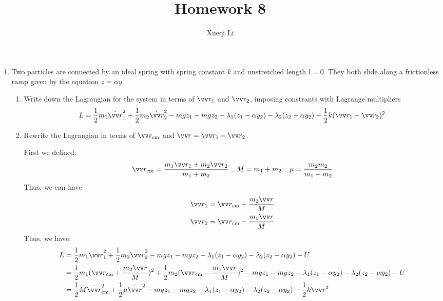 \documentclass{article}
\begin{document}
\title{Homework 8}
\author{Xueqi Li}


\maketitle
\begin{enumerate}
    \item Two particles are connected by an ideal spring with spring constant $k$ and unstretched length $l = 0$. They both slide along a frictionless ramp given by the equation $z = \alpha y$.
    \begin{enumerate}
        \item Write down the Lagrangian for the system in terms of $\vv r_1$ and $\vv r_2$, imposing constrants with Lagrange multipliers\\

        \[
        L = \frac{1}{2} m_1 \dot{\vv r}_1^2 + \frac{1}{2}m_2 \dot{\vv r}_2^2 -mgz_1 - mgz_2 - \lambda_1 (z_1 - \alpha y_2) - \lambda_2 (z_2 - \alpha y_2) - \frac{1}{2}k (\vv r_1 - \vv r_2)^2
        \]

        \item Rewrite the Lagrangian in terms of $\vv r_\text{cm}$ and $\vv r = \vv r_1 - \vv r_2$.
        
        First we defined:
        \[
        \vv r_\text{cm} = \frac{m_1 \vv r_1 + m_2 \vv r_2}{m_1 + m_2} \ ,\ M = m_1 + m_2 \ ,\ \mu = \frac{m_2 m_2}{m_1 + m_2}
        \]
        Thus, we can have
        \begin{align*}
            \vv r_1= \vv r_\text{cm} + \frac{m_2 \vv r}{M} \\
            \vv r_2= \vv r_\text{cm} - \frac{m_1 \vv r}{M}
        \end{align*}
        Thus, we have:
        \begin{align*}
            L &= \frac{1}{2}m_1 \dot{\vv r}_1^2 + \frac{1}{2}m_2 \dot{\vv r}_2^2 -mgz_1 - mgz_2 - \lambda_1 (z_1 - \alpha y_2) - \lambda_2 (z_2 - \alpha y_2) - U \\
              &= \frac{1}{2}m_1 (\vv r_\text{cm} + \frac{m_2 \vv r}{M})^2 + \frac{1}{2}m_2 (\vv r_\text{cm} - \frac{m_1 \vv r}{M})^2 -mgz_1 - mgz_2 - \lambda_1 (z_1 - \alpha y_2) - \lambda_2 (z_2 - \alpha y_2) - U \\
              &= \frac{1}{2}M \dot{\vv r}_\text{cm}^2 + \frac{1}{2}\mu \dot{\vv r}^2 - mgz_1 - mgz_2 - \lambda_1 (z_1 - \alpha y_2) - \lambda_2 (z_2 - \alpha y_2) - \frac{1}{2} k \vv r^2
        \end{align*}


\end{enumerate}
\end{enumerate}
\end{document}
